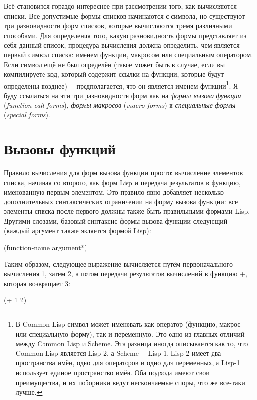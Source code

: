 Всё становится гораздо интереснее при рассмотрении того, как вычисляются списки. Все
допустимые формы списков начинаются с символа, но существуют три разновидности форм
списков, которые вычисляются тремя различными способами. Для определения того, какую
разновидность формы представляет из себя данный список, процедура вычисления должна
определить, чем является первый символ списка: именем функции, макросом или специальным
оператором. Если символ ещё не был определён (такое может быть в случае, если вы
компилируете код, который содержит ссылки на функции, которые будут определены позднее)~--
предполагается, что он является именем функции\footnote{В Common Lisp символ может
  именовать как оператор (функцию, макрос или специальную форму), так и переменную. Это
  одно из главных отличий между Common Lisp и Scheme. Эта разница иногда описывается как
  то, что Common Lisp является Lisp-2, а Scheme~-- Lisp-1. Lisp-2 имеет два пространства
  имён, одно для операторов и одно для переменных, а Lisp-1 использует единое пространство
  имён. Оба подхода имеют свои преимущества, и их поборники ведут нескончаемые споры, что
  же все-таки лучше.}. Я буду ссылаться на эти три разновидности форм как на \textit{формы
  вызова функции} (\textit{function call forms}), \textit{формы макросов} (\textit{macro
  forms}) и \textit{специальные формы} (\textit{special forms}).

\section{Вызовы функций}

Правило вычисления для форм вызова функции просто: вычисление элементов списка, начиная со
второго, как форм Lisp и передача результатов в функцию, именованную первым элементом. Это
правило явно добавляет несколько дополнительных синтаксических ограничений на форму вызова
функции: все элементы списка после первого должны также быть правильными формами
Lisp. Другими словами, базовый синтаксис формы вызова функции следующий (каждый аргумент
также является формой Lisp):

\begin{myverb}
  (function-name argument*)
\end{myverb}

Таким образом, следующее выражение вычисляется путём первоначального вычисления 1, затем
2, а потом передачи результатов вычислений в функцию +, которая возвращает 3:

\begin{myverb}
  (+ 1 2)
\end{myverb}

